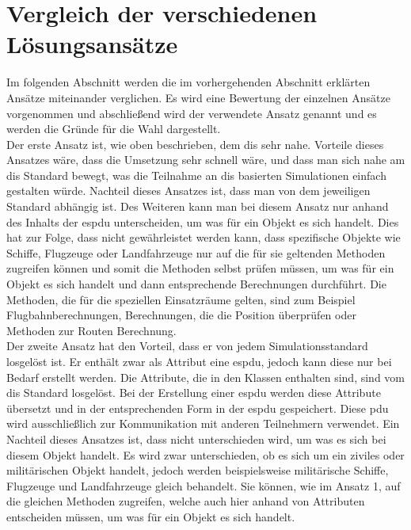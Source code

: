 \section{Vergleich der verschiedenen Lösungsansätze} 
Im folgenden Abschnitt werden die im vorhergehenden Abschnitt erklärten Ansätze miteinander verglichen. Es wird eine Bewertung der einzelnen Ansätze vorgenommen und abschließend wird der verwendete Ansatz genannt und es werden die Gründe für die Wahl dargestellt.\\
Der erste Ansatz ist, wie oben beschrieben, dem \ac{dis} sehr nahe. Vorteile dieses Ansatzes wäre, dass die Umsetzung sehr schnell wäre, und dass man sich nahe am \ac{dis} Standard bewegt, was die Teilnahme an \ac{dis} basierten Simulationen einfach gestalten würde. Nachteil dieses Ansatzes ist, dass man von dem jeweiligen Standard abhängig ist. Des Weiteren kann man bei diesem Ansatz nur anhand des Inhalts der \ac{espdu} unterscheiden, um was für ein Objekt es sich handelt. Dies hat zur Folge, dass nicht gewährleistet werden kann, dass  spezifische Objekte wie Schiffe, Flugzeuge oder Landfahrzeuge nur auf die für sie geltenden Methoden zugreifen können und somit die Methoden selbst prüfen müssen, um was für ein Objekt es sich handelt und dann entsprechende Berechnungen durchführt. Die Methoden, die für die speziellen Einsatzräume gelten, sind zum Beispiel Flugbahnberechnungen, Berechnungen, die die Position überprüfen oder Methoden zur Routen Berechnung.    \\
Der zweite  Ansatz hat den Vorteil, dass er von jedem Simulationsstandard losgelöst ist. Er enthält zwar als Attribut eine \ac{espdu}, jedoch kann diese nur bei Bedarf erstellt werden. Die Attribute, die in den Klassen enthalten sind, sind vom \ac{dis} Standard losgelöst. Bei der Erstellung  einer  \ac{espdu} werden diese Attribute übersetzt und in der entsprechenden Form in der \ac{espdu} gespeichert. Diese \ac{pdu} wird ausschließlich zur Kommunikation mit anderen Teilnehmern verwendet. Ein Nachteil dieses Ansatzes ist, dass nicht unterschieden wird, um was es sich bei diesem Objekt handelt. Es wird zwar unterschieden, ob es sich um ein ziviles oder militärischen Objekt handelt, jedoch werden beispielsweise militärische Schiffe, Flugzeuge und Landfahrzeuge gleich behandelt. Sie können, wie im Ansatz 1, auf die gleichen Methoden zugreifen, welche auch hier anhand von Attributen entscheiden müssen, um was für ein Objekt es sich handelt. \\
